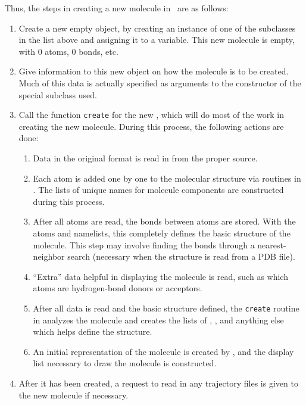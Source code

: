 Thus, the steps in creating a new molecule in \VMD\ are as follows:
\begin{enumerate}
  \item Create a new empty  object, by creating an instance of one of the subclasses in the list above and assigning it to a  variable.  This new molecule is empty, with 0 atoms, 0 bonds, etc.
  \item Give information to this new object on how the molecule is to be created.  Much of this data is actually specified as arguments to the constructor of the special subclass used.
  \item Call the function {\tt create} for the new , which will do most of the work in creating the new molecule.  During this process, the following actions are done:
    \begin{enumerate}
      \item Data in the original format is read in from the proper source.
      \item Each atom is added one by one to the molecular structure via routines in .  The lists of unique names for molecule components are constructed during this process.
      \item After all atoms are read, the bonds between atoms are stored.  With the atoms and namelists, this completely defines the basic structure of the molecule.  This step may involve finding the bonds through a nearest-neighbor search (necessary when the structure is read from a PDB file).
      \item ``Extra'' data helpful in displaying the molecule is read, such as which atoms are hydrogen-bond donors or acceptors.
      \item After all data is read and the basic structure defined, the {\tt create} routine in  analyzes the molecule and creates the lists of , , and anything else which helps define the structure.
      \item An initial representation of the molecule is created by , and the display list necessary to draw the molecule is constructed.
    \end{enumerate}
  \item After it has been created, a request to read in any trajectory files is given to the new molecule if necessary.
\end{enumerate}

